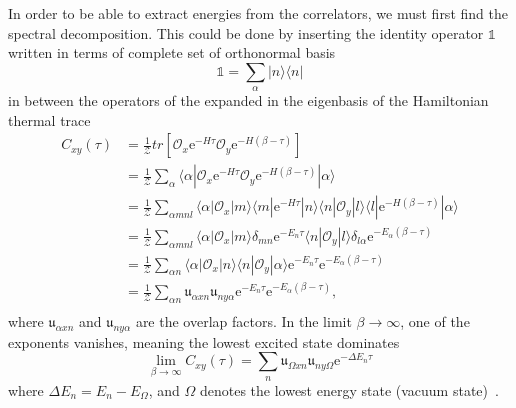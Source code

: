 In order to be able to extract energies from the correlators, we must first find the spectral decomposition. This could be done by inserting the identity operator $\mathds{1}$ written in terms of complete set of orthonormal basis
\begin{equation}
    \mathds{1} = \sum_\alpha | n \rangle \langle n |
\end{equation}
in between the operators of the expanded in the eigenbasis of the Hamiltonian thermal trace
\begin{equation}
    \begin{aligned}
        C_{xy}(\tau) &= \frac{1}{\mathcal{Z}}tr\left[ \mathcal{O}_x\mathrm{e}^{-H\tau}\mathcal{O}_y\mathrm{e}^{-H(\beta - \tau)} \right] 
        \\
        &= \frac{1}{\mathcal{Z}}\sum_\alpha\langle \alpha | \mathcal{O}_x\mathrm{e}^{-H\tau}\mathcal{O}_y\mathrm{e}^{-H(\beta - \tau)} | \alpha \rangle 
        \\
        &= \frac{1}{\mathcal{Z}}\sum_{\alpha mnl} \langle \alpha | \mathcal{O}_x | m \rangle \langle m | \mathrm{e}^{-H\tau} | n \rangle \langle n | \mathcal{O}_y | l \rangle \langle l | \mathrm{e}^{-H(\beta - \tau)} | \alpha \rangle 
        \\
        &= \frac{1}{\mathcal{Z}}\sum_{\alpha mnl}\langle \alpha | \mathcal{O}_x | m \rangle \delta_{mn}\mathrm{e}^{-E_n\tau} \langle n | \mathcal{O}_y | l \rangle \delta_{l\alpha}\mathrm{e}^{-E_\alpha(\beta - \tau)}
        \\
        &= \frac{1}{\mathcal{Z}}\sum_{\alpha n}\langle \alpha | \mathcal{O}_x | n \rangle \langle n | \mathcal{O}_y | \alpha \rangle \mathrm{e}^{-E_n\tau} \mathrm{e}^{-E_\alpha(\beta - \tau)}
        \\
        &= \frac{1}{\mathcal{Z}}\sum_{\alpha n} \mathfrak{u}_{\alpha xn} \mathfrak{u}_{ ny\alpha} \mathrm{e}^{-E_n\tau} \mathrm{e}^{-E_\alpha(\beta - \tau)},
        \\
    \end{aligned}
    \label{eq:fit_exponent}
\end{equation}
where $\mathfrak{u}_{\alpha xn}$ and $\mathfrak{u}_{ ny\alpha}$ are the overlap factors. In the limit $\beta \to \infty$, one of the exponents vanishes, meaning the lowest excited state dominates
\begin{equation}
    \lim_{\beta \to \infty} C_{xy}(\tau) = \sum_{n} \mathfrak{u}_{\Omega xn} \mathfrak{u}_{ ny\Omega} \mathrm{e}^{-\Delta E_n\tau}
    \label{eq:beta_lim}
\end{equation}
where $\Delta E_n = E_n - E_\Omega$, and $\Omega$ denotes the lowest energy state (vacuum state)~\cite{evan, mott}.

